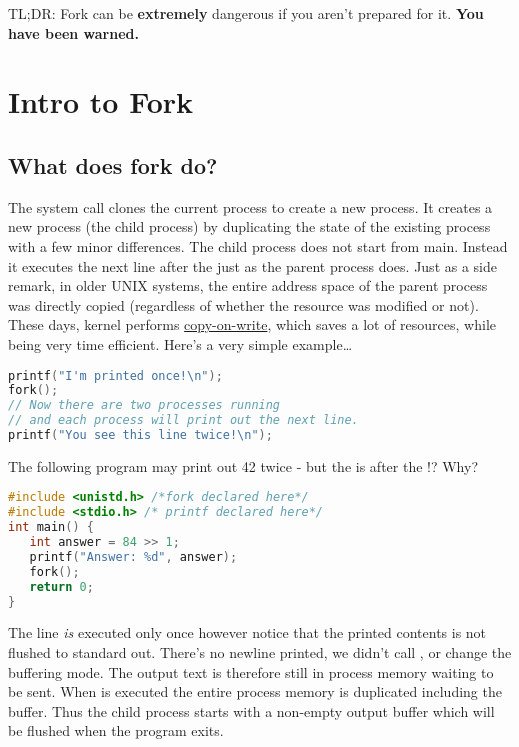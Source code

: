 TL;DR: Fork can be \textbf{extremely} dangerous if you aren't prepared for it. \textbf{You have been warned.}

\section{Intro to Fork}\label{intro-to-fork}

\subsection{What does fork do?}\label{what-does-fork-do}

The  system call clones the current process to create a new process. It creates a new process (the child process) by duplicating the state of the existing process with a few minor differences. The child process does not start from main. Instead it executes the next line after the  just as the parent process does. Just as a side remark, in older UNIX systems, the entire address space of the parent process was directly copied (regardless of whether the resource was modified or not). These days, kernel performs \href{https://en.wikipedia.org/wiki/Copy-on-write}{copy-on-write}, which saves a lot of resources, while being very time efficient. Here's a very simple example\ldots{}

\begin{lstlisting}[language=C]
printf("I'm printed once!\n");
fork();
// Now there are two processes running
// and each process will print out the next line.
printf("You see this line twice!\n");
\end{lstlisting}

The following program may print out 42 twice - but the  is after the !? Why?

\begin{lstlisting}[language=C]
#include <unistd.h> /*fork declared here*/
#include <stdio.h> /* printf declared here*/
int main() {
   int answer = 84 >> 1;
   printf("Answer: %d", answer);
   fork();
   return 0;
}
\end{lstlisting}

The  line \emph{is} executed only once however notice that the printed contents is not flushed to standard out. There's no newline printed, we didn't call , or change the buffering mode. The output text is therefore still in process memory waiting to be sent. When  is executed the entire process memory is duplicated including the buffer. Thus the child process starts with a non-empty output buffer which will be flushed when the program exits.

